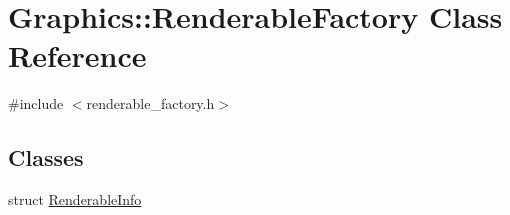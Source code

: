 \hypertarget{class_graphics_1_1_renderable_factory}{}\section{Graphics\+:\+:Renderable\+Factory Class Reference}
\label{class_graphics_1_1_renderable_factory}


{\ttfamily \#include $<$renderable\+\_\+factory.\+h$>$}

\subsection*{Classes}
\begin{DoxyCompactItemize}
\item 
struct \hyperlink{struct_graphics_1_1_renderable_factory_1_1_renderable_info}{Renderable\+Info}
\end{DoxyCompactItemize}

